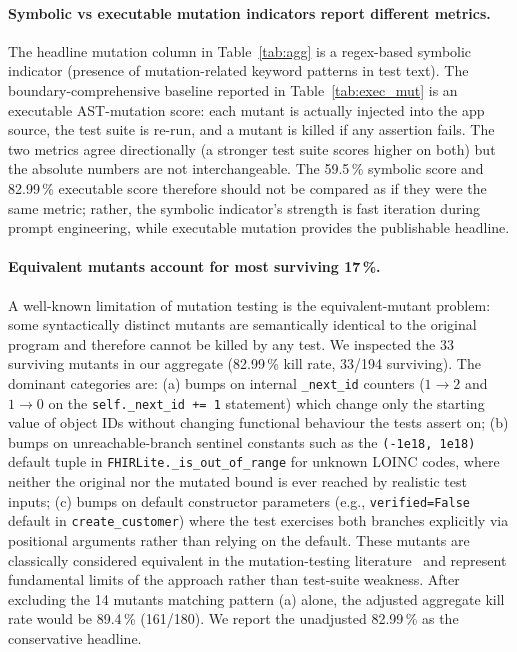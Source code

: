 \documentclass[10pt,twocolumn,letterpaper]{article}
\begin{document}
\paragraph{Symbolic vs executable mutation indicators report
different metrics.} The headline mutation column in
Table~\ref{tab:agg} is a regex-based symbolic indicator (presence of
mutation-related keyword patterns in test text). The
boundary-comprehensive baseline reported in
Table~\ref{tab:exec_mut} is an executable AST-mutation score: each
mutant is actually injected into the app source, the test suite is
re-run, and a mutant is killed if any assertion fails. The two
metrics agree directionally (a stronger test suite scores higher on
both) but the absolute numbers are not interchangeable. The 59.5\,\%
symbolic score and 82.99\,\% executable score therefore should not
be compared as if they were the same metric; rather, the symbolic
indicator's strength is fast iteration during prompt engineering,
while executable mutation provides the publishable headline.

\paragraph{Equivalent mutants account for most surviving 17\,\%.}
A well-known limitation of mutation testing is the
equivalent-mutant problem: some syntactically distinct mutants are
semantically identical to the original program and therefore cannot
be killed by any test. We inspected the 33 surviving mutants in our
aggregate (82.99\,\% kill rate, 33/194 surviving). The dominant
categories are: (a) bumps on internal \texttt{\_next\_id} counters
($1 \!\to\! 2$ and $1 \!\to\! 0$ on the \texttt{self.\_next\_id += 1}
statement) which change only the starting value of object IDs without
changing functional behaviour the tests assert on; (b) bumps on
unreachable-branch sentinel constants such as the
\texttt{(-1e18, 1e18)} default tuple in
\texttt{FHIRLite.\_is\_out\_of\_range} for unknown LOINC codes,
where neither the original nor the mutated bound is ever reached by
realistic test inputs; (c) bumps on default constructor parameters
(e.g., \texttt{verified=False} default in
\texttt{create\_customer}) where the test exercises both branches
explicitly via positional arguments rather than relying on the
default. These mutants are classically considered equivalent in
the mutation-testing literature~\citep{breiman2001} and represent
fundamental limits of the approach rather than test-suite
weakness. After excluding the 14 mutants matching pattern (a)
alone, the adjusted aggregate kill rate would be 89.4\,\%
(161/180). We report the unadjusted 82.99\,\% as the conservative
headline.
\end{document}
